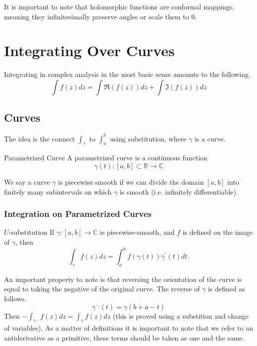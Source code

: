 \documentclass{article}
\begin{document}
It is important to note that holomorphic functions are conformal mappings, meaning they infinitesimally preserve angles or scale them to 0.



\section{Integrating Over Curves}

Integrating in complex analysis in the most basic sense amounts to the following.
\[
    \int f(z) dz = \int \Re (f(z))dz + \int \Im (f(z)) dz
\]

\subsection{Curves}

The idea is the connect \( \int _\gamma  \) to \( \int _a^b \) using substitution, where \( \gamma  \) is a curve.

\begin{defn}{Parametrized Curve}{}
A parametrized curve is a continuous function
\[
    \gamma (t): [a,b] \subset \mathbb{R} \to \mathbb{C} 
\]
\end{defn}

We say a curve \( \gamma  \) is piecewise smooth if we can divide the domain \( [a,b] \) into finitely many subintervals on which \( \gamma  \) is smooth (i.e. infinitely differentiable).

\subsubsection{Integration on Parametrized Curves}

\begin{thrm}{$U$-substitution}{}
If \( \gamma : [a,b] \to \mathbb{C}  \) is piecewise-smooth, and \( f \) is defined on the image of \( \gamma \), then 
\[
    \boxed{\int _\gamma  f(z) dz = \int ^b_a f(\gamma (t))\gamma ^\prime (t) dt.} 
\]
\end{thrm}

An important property to note is that reversing the orientation of the curve is equal to taking the negative of the original curve. The reverse of \( \gamma  \) is defined as follows.
\[
    \gamma ^-(t ) = \gamma (b + a - t)
\]
Then \(- \int _{\gamma ^-} f(z) dz = \int _\gamma f(z) dz \) (this is proved using a substition and change of variables). As a matter of definitions it is important to note that we refer to an antiderivative as a primitive, these terms should be taken as one and the same. 
\end{document}
